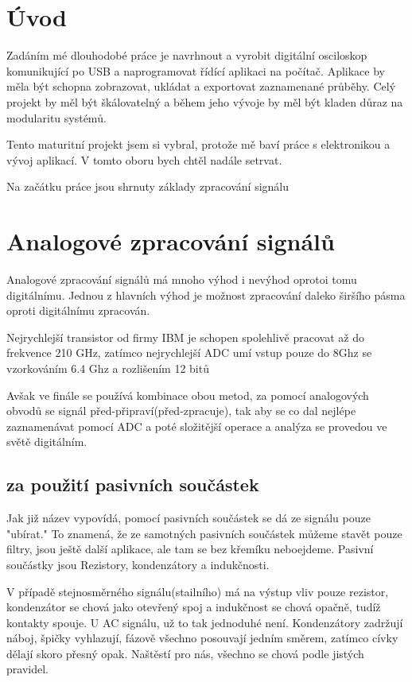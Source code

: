 \documentclass[oneside,12pt,a4paper]{template/SPSTemplate} %
\begin{document}
	\makebeginning

	\tableofcontents
	
	\chapter{Úvod}

	Zadáním mé dlouhodobé práce je navrhnout a vyrobit digitální osciloskop komunikující po USB a naprogramovat řídící aplikaci na počítač. 
	Aplikace by měla být schopna zobrazovat, ukládat a exportovat zaznamenané průběhy. Celý projekt by měl být škálovatelný a během jeho vývoje by měl být kladen důraz na modularitu systémů. 
	
	Tento maturitní projekt jsem si vybral, protože mě baví práce s elektronikou a vývoj aplikací. V tomto oboru bych chtěl nadále setrvat.

	Na začátku práce jsou shrnuty základy zpracování signálu

	
	\chapter{Analogové zpracování signálů}
		Analogové zpracování signálů má mnoho výhod i nevýhod oprotoi tomu digitálnímu. Jednou z hlavních výhod je možnost zpracování daleko širšího pásma oproti digitálnímu zpracován. 

		Nejrychlejší transistor od firmy IBM je schopen spolehlivě pracovat až do frekvence 210 GHz, zatímco nejrychlejší ADC umí vstup pouze do 8Ghz se vzorkováním 6.4 Ghz a rozlišením 12 bitů \cite{(http://www.ti.com/product/adc12dl3200).}

		Avšak ve finále se používá kombinace obou metod, za pomocí analogových obvodů se signál před-připraví(před-zpracuje), tak aby se co dal nejlépe zaznamenávat pomocí ADC a poté složitější operace a analýza se provedou ve světě digitálním.

		\section{za použití pasivních součástek}
			Jak již název vypovídá, pomocí pasivních součástek se dá ze signálu pouze "ubírat." To znamená, že ze samotných pasivních součástek můžeme stavět pouze filtry, jsou ještě další aplikace, ale tam se bez křemíku neboejdeme.
			Pasivní součástky jsou Rezistory, kondenzátory a indukčnosti.

			V případě stejnosměrného signálu(stailního) má na výstup vliv pouze rezistor, kondenzátor se chová jako otevřený spoj a indukčnost se chová opačně, tudíž kontakty spouje.
			U AC signálu, už to tak jednoduhé není. Kondenzátory zadržují náboj, špičky vyhlazují, fázově všechno posouvají jedním směrem, zatímco cívky dělají skoro přesný opak. Naštěstí pro nás, všechno se chová podle jistých pravidel.
\end{document}
